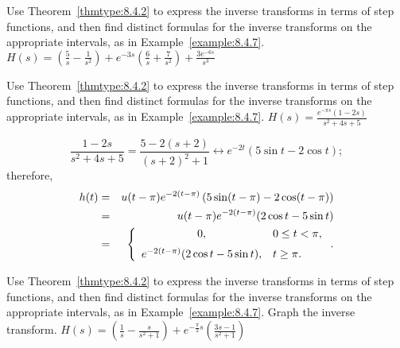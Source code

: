 \documentclass{ximera}
\begin{document}
\begin{problem}\label{exer:8.4.23} Use Theorem~\ref{thmtype:8.4.2} to express the inverse transforms in terms of step functions, and then find distinct formulas for the inverse transforms on the appropriate intervals, as in
Example~\ref{example:8.4.7}.
$H(s)=\left(\frac{5}{s}-\frac{1}{s^2}\right)
+e^{-3s}\left(\frac{6}{s}+\frac{7}{s^2}\right)+\frac{3e^{-6s}}{s^3}$
\end{problem}

\begin{problem}\label{exer:8.4.24}
Use Theorem~\ref{thmtype:8.4.2} to express the inverse transforms in terms of step functions, and then find distinct formulas for the inverse transforms on the appropriate intervals, as in
Example~\ref{example:8.4.7}.
$H(s)=\frac{e^{-\pi s} (1-2s)}{s^2+4s+5}$

\begin{solution}
$$
\frac{1-2s}{s^2+4s+5}=\frac{5-2(s+2)}{(s+2)^2+1}\leftrightarrow
e^{-2t}(5\sin t-2\cos t);
$$
therefore,
\begin{eqnarray*}
h(t)&=&u(t-\pi)e^{-2(t-\pi)} \left(5\sin(t-\pi)-2\cos(t-\pi)\right)\\
&=&u(t-\pi)e^{-2(t-\pi)} (2\cos t-5\sin t)\\
&=&\left\{\begin{array}{cl} 0, &0\le t<\pi,\\[2\jot]
e^{-2(t-\pi)}(2\cos t-5\sin t),&t\ge\pi. \end{array}\right..
\end{eqnarray*}
\end{solution}
\end{problem}

\begin{problem}\label{exer:8.4.25} Use Theorem~\ref{thmtype:8.4.2} to express the inverse transforms in terms of step functions, and then find distinct formulas for the inverse transforms on the appropriate intervals, as in
Example~\ref{example:8.4.7}.  Graph the inverse transform.
$H(s)=\left(\frac{1}{s}-\frac{s}{s^2+1}\right)+e^{-\frac{\pi}{2}s}\left(\frac{3s-1}{s^2+1}\right)$
\end{problem}
\end{document}
